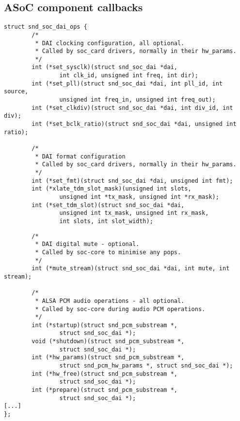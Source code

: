 \subsection{ASoC component callbacks}

\begin{frame}[fragile]{}
  \begin{block}{}
    \fontsize{9}{9}\selectfont
    \begin{verbatim}
struct snd_soc_dai_ops {
        /*
         * DAI clocking configuration, all optional.
         * Called by soc_card drivers, normally in their hw_params.
         */
        int (*set_sysclk)(struct snd_soc_dai *dai,
                int clk_id, unsigned int freq, int dir);
        int (*set_pll)(struct snd_soc_dai *dai, int pll_id, int source,
                unsigned int freq_in, unsigned int freq_out);
        int (*set_clkdiv)(struct snd_soc_dai *dai, int div_id, int div);
        int (*set_bclk_ratio)(struct snd_soc_dai *dai, unsigned int ratio);

        /*
         * DAI format configuration
         * Called by soc_card drivers, normally in their hw_params.
         */
        int (*set_fmt)(struct snd_soc_dai *dai, unsigned int fmt);
        int (*xlate_tdm_slot_mask)(unsigned int slots,
                unsigned int *tx_mask, unsigned int *rx_mask);
        int (*set_tdm_slot)(struct snd_soc_dai *dai,
                unsigned int tx_mask, unsigned int rx_mask,
                int slots, int slot_width);
    \end{verbatim}
  \end{block}
\end{frame}

\begin{frame}[fragile]{}
  \begin{block}{}
    \fontsize{9}{9}\selectfont
    \begin{verbatim}
        /*
         * DAI digital mute - optional.
         * Called by soc-core to minimise any pops.
         */
        int (*mute_stream)(struct snd_soc_dai *dai, int mute, int stream);

        /*
         * ALSA PCM audio operations - all optional.
         * Called by soc-core during audio PCM operations.
         */
        int (*startup)(struct snd_pcm_substream *,
                struct snd_soc_dai *);
        void (*shutdown)(struct snd_pcm_substream *,
                struct snd_soc_dai *);
        int (*hw_params)(struct snd_pcm_substream *,
                struct snd_pcm_hw_params *, struct snd_soc_dai *);
        int (*hw_free)(struct snd_pcm_substream *,
                struct snd_soc_dai *);
        int (*prepare)(struct snd_pcm_substream *,
                struct snd_soc_dai *);
[...]
};
    \end{verbatim}
  \end{block}
\end{frame}

